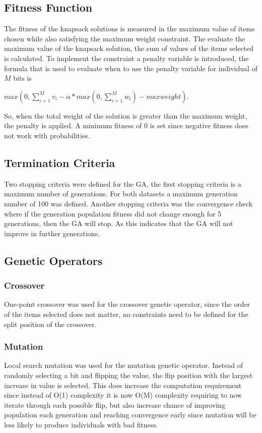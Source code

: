\documentclass{article}
\begin{document}
\subsection*{Fitness Function}
The fitness of the knapsack solutions is measured in the maximum value of items chosen while also satisfying the maximum weight constraint. The evaluate the maximum value of the knapsack solution, the sum of values of the items selected is calculated. To implement the constraint a penalty variable is introduced, the formula that is used to evaluate when to use the penalty variable for individual of $M$ bits is 
\begin{center} 
$max(0, \sum_{i=1}^{M}v_i - \alpha *max(0,\sum_{i=1}^{M}w_i)-max weight)$. 
\end{center}
So, when the total weight of the solution is greater than the maximum weight, the penalty is applied. A minimum fitness of 0 is set since negative fitness does not work with probabilities.
\subsection*{Termination Criteria}
Two stopping criteria were defined for the GA, the first stopping criteria is a maximum number of generations. For both datasets a maximum generation number of 100 was defined. Another stopping criteria was the convergence check where if the generation population fitness did not change enough for 5 generations, then the GA will stop. As this indicates that the GA will not improve in further generations. \par
\subsection*{Genetic Operators}
\subsubsection*{Crossover}
One-point crossover was used for the crossover genetic operator, since the order of the items selected does not matter, no constraints need to be defined for the split position of the crossover. 
\subsubsection*{Mutation}
Local search mutation was used for the mutation genetic operator. Instead of randomly selecting a bit and flipping the value, the flip position with the largest increase in value is selected. This does increase the computation requirement since instead of O(1) complexity it is now O(M) complexity requiring to now iterate through each possible flip, but also increase chance of improving population each generation and reaching convergence early since mutation will be less likely to produce individuals with bad fitness. 
\end{document}
